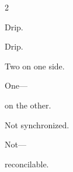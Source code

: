 \begin{paracol}{2}
\switchcolumn

Drip.

\medskip

\switchcolumn*

Drip.

\medskip

\switchcolumn

Two on one side.

\medskip

One---

\medskip

on the other.

\medskip

\switchcolumn*

Not synchronized.

\medskip

\switchcolumn

Not---

\medskip

reconcilable.

\medskip

\end{paracol}

\pagestyle{incoherence}
